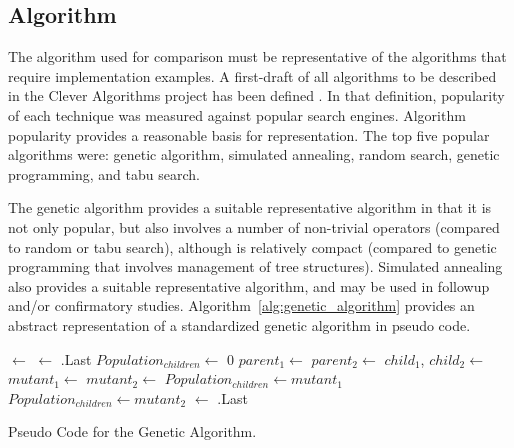 \documentclass[a4paper, 11pt]{article}
\begin{document}
% 
% 
\subsection{Algorithm}
The algorithm used for comparison must be representative of the algorithms that require implementation examples. A first-draft of all algorithms to be described in the Clever Algorithms project has been defined \cite{Brownlee2010a}. In that definition, popularity of each technique was measured against popular search engines. Algorithm popularity provides a reasonable basis for representation. The top five popular algorithms were: genetic algorithm, simulated annealing, random search, genetic programming, and tabu search.

The genetic algorithm provides a suitable representative algorithm in that it is not only popular, but also involves a number of non-trivial operators (compared to random or tabu search), although is relatively compact (compared to genetic programming that involves management of tree structures). Simulated annealing also provides a suitable representative algorithm, and may be used in followup and/or confirmatory studies. 
Algorithm~\ref{alg:genetic_algorithm} provides an abstract representation of a standardized genetic algorithm in pseudo code.

\begin{algorithm}[ht]
  \SetLine  
  
  
  \KwOut{\Best}
  	
	\Pop $\leftarrow$ \InitializeRandomBitstrings{\PopSize, \Length}\;
	 {
	 	\;
	 }
	\Best $\leftarrow$ .Last\;
	\While{$\neg$\StopCondition{}}
	{
	 $Population_{children} \leftarrow$ 0\;
	{
		$parent_1 \leftarrow$ \TournamentSelection{\Pop, \BoutSize}\;
		$parent_2 \leftarrow$ \TournamentSelection{\Pop, \BoutSize}\;
		$child_1$, $child_2 \leftarrow$ \;
		$mutant_1 \leftarrow$ \;
		$mutant_2 \leftarrow$ \;
		$Population_{children} \leftarrow mutant_1$\;
		$Population_{children} \leftarrow mutant_2$\;
	}
	 {
	 	\;
	 }
	 \Best $\leftarrow$ .Last\;
	 \;	 
	}
	\Return{\Best}\;
	
	\caption{Pseudo Code for the Genetic Algorithm.}
	\label{alg:genetic_algorithm}
\end{algorithm}
\end{document}
